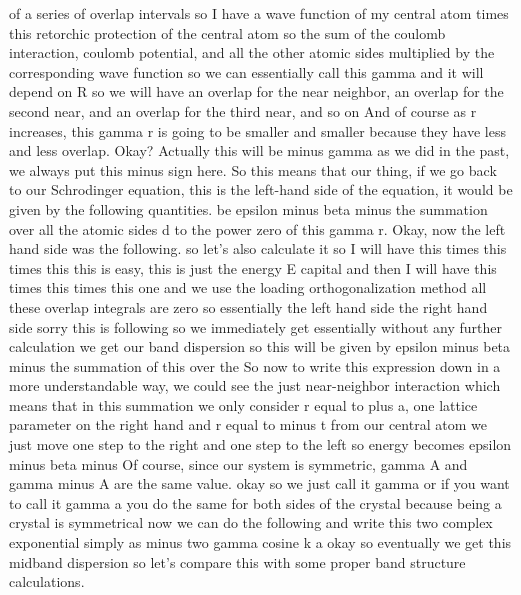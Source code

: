 of a series of overlap intervals so I have a wave function of my central atom times this retorchic protection of the central atom so the sum of the coulomb interaction, coulomb potential, and all the other atomic sides multiplied by the corresponding wave function so we can essentially call this gamma and it will depend on R so we will have an overlap for the near neighbor, an overlap for the second near, and an overlap for the third near, and so on And of course as r increases, this gamma r is going to be smaller and smaller because they have less and less overlap. Okay? Actually this will be minus gamma as we did in the past, we always put this minus sign here. So this means that our thing, if we go back to our Schrodinger equation, this is the left-hand side of the equation, it would be given by the following quantities. be epsilon minus beta minus the summation over all the atomic sides d to the power zero of this gamma r. Okay, now the left hand side was the following. so let's also calculate it so I will have this times this times this this is easy, this is just the energy E capital and then I will have this times this times this one and we use the loading orthogonalization method all these overlap integrals are zero so essentially the left hand side the right hand side sorry this is following so we immediately get essentially without any further calculation we get our band dispersion so this will be given by epsilon minus beta minus the summation of this over the So now to write this expression down in a more understandable way, we could see the just near-neighbor interaction which means that in this summation we only consider r equal to plus a, one lattice parameter on the right hand and r equal to minus t from our central atom we just move one step to the right and one step to the left so energy becomes epsilon minus beta minus Of course, since our system is symmetric, gamma A and gamma minus A are the same value. okay so we just call it gamma or if you want to call it gamma a you do the same for both sides of the crystal because being a crystal is symmetrical now we can do the following and write this two complex exponential simply as minus two gamma cosine k a okay so eventually we get this midband dispersion so let's compare this with some proper band structure calculations.
